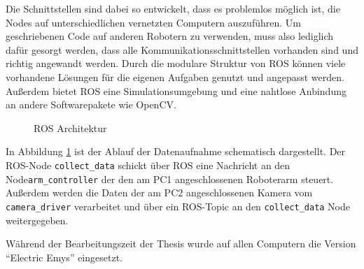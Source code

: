 Die Schnittstellen sind dabei so entwickelt, dass es problemlos möglich ist, die
Nodes auf unterschiedlichen vernetzten Computern auszuführen.  Um geschriebenen
Code auf anderen Robotern zu verwenden, muss also lediglich dafür gesorgt werden, dass
alle Kommunikationsschnittstellen vorhanden sind und richtig angewandt werden.
Durch die modulare Struktur von \ac{ROS} können viele vorhandene Lösungen für
die eigenen Aufgaben genutzt und angepasst werden. Außerdem bietet \ac{ROS}
eine Simulationsumgebung und eine nahtlose Anbindung an andere Softwarepakete
wie OpenCV.


\begin{figure}[hbtp]


\caption{\ac{ROS} Architektur}

\label{fig:architecture_ros}

\end{figure}
In Abbildung \ref{fig:architecture_ros} ist der Ablauf der Datenaufnahme schematisch dargestellt. Der
\ac{ROS}-Node \allowbreak \texttt{collect\_data} schickt über \ac{ROS} eine Nachricht
an den Node\break \texttt{arm\_controller} der den am PC1 angeschlossenen 
Roboterarm steuert. Außerdem werden die Daten der am PC2 angeschlossenen Kamera
vom \texttt{camera\_driver} verarbeitet und über ein \ac{ROS}-Topic an den 
\texttt{collect\_data} Node weitergegeben.

Während der Bearbeitungszeit der Thesis wurde auf allen Computern die Version
"`Electric Emys"' eingesetzt.



